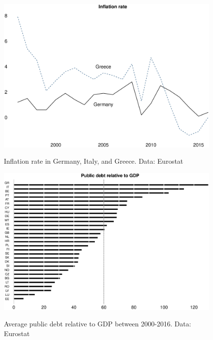 \documentclass{tufte-handout}
\begin{document}
\begin{figure}
  \includegraphics[scale=.3]{inflation}
  \label{fig:inflation}
  \caption{Inflation rate in Germany, Italy, and Greece. Data: Eurostat}
\end{figure}
\begin{figure}
  \includegraphics[scale=.3]{public_debt}
  \label{fig:public_debt}
  \caption{Average public debt relative to GDP between 2000-2016. Data: Eurostat}
\end{figure}
\end{document}
